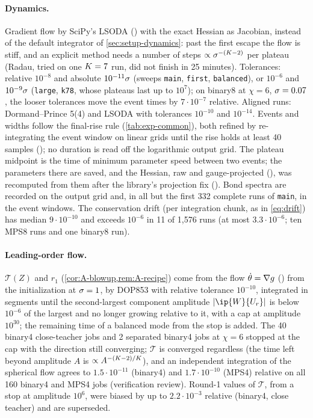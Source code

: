 \paragraph{Dynamics.}
Gradient flow by SciPy's LSODA () with the exact Hessian as Jacobian,
instead of the default integrator of \cref{sec:setup-dynamics}: past the first escape the flow is stiff,
and an explicit method needs a number of steps $\propto\sigma^{-(K-2)}$ per plateau (Radau, tried on one
$K=7$ run, did not finish in 25 minutes). Tolerances: relative $10^{-8}$ and absolute $10^{-11}\sigma$
(sweeps \texttt{main}, \texttt{first}, \texttt{balanced}), or $10^{-6}$ and $10^{-9}\sigma$ (\texttt{large},
\texttt{k78}, whose plateaus last up to $10^{7}$); on binary8 at $\chi=6$, $\sigma=0.07$, the looser tolerances
move the event times by $7\cdot10^{-7}$ relative. Aligned runs: Dormand--Prince 5(4) and LSODA with
tolerances $10^{-10}$ and $10^{-14}$. Events and widths follow the final-rise rule (\cref{tab:exp-common}), both
refined by re-integrating the event window on linear grids until the rise holds at least 40 samples
(); no duration is read off the
logarithmic output grid. The plateau midpoint is the time of minimum parameter speed between two events;
the parameters there are saved, and the Hessian, raw and gauge-projected
(), was recomputed from them after the library's projection fix
(). Bond spectra are recorded on the output grid and, in all but the first 332
complete runs of \texttt{main}, in the event windows. The conservation drift (per integration chunk, as in
\eqref{eq:drift}) has median $9\cdot10^{-10}$ and exceeds $10^{-6}$ in 11 of 1,576 runs (at most
$3.3\cdot10^{-6}$; ten MPS8 runs and one binary8 run).

\paragraph{Leading-order flow.}
$\mathcal T(Z)$ and $r_1$ (\cref{cor:A-blowup,rem:A-recipe}) come from the flow \mbox{$\dot{\theta}=\nabla g$}
() from the initialization at $\sigma=1$, by DOP853 with relative tolerance $10^{-10}$,
integrated in segments until the second-largest component amplitude $\abs{\ip{\W}{\U r}}$ is below $10^{-6}$
of the largest and no longer growing relative to it, with a cap at amplitude $10^{30}$; the remaining time
of a balanced mode from the stop is added. The 40 binary4 close-teacher jobs and 2 separated binary4 jobs
at $\chi=6$ stopped at the cap with the direction still converging; $\mathcal T$ is converged regardless (the time
left beyond amplitude $A$ is $\propto A^{-(K-2)/K}$), and an independent integration of the spherical
flow agrees to $1.5\cdot10^{-11}$ (binary4) and $1.7\cdot10^{-10}$ (MPS4) relative on all 160 binary4 and
MPS4 jobs (verification review). Round-1 values of $\mathcal T$, from a stop at amplitude $10^6$, were biased by up to
$2.2\cdot10^{-3}$ relative (binary4, close teacher) and are superseded.

